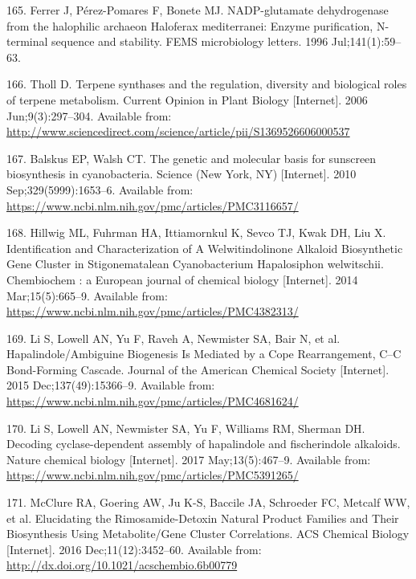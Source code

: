 \documentclass[12pt,twoside]{reedthesis}
\begin{document}
  \hypertarget{ref-ferrer_nadp-glutamate_1996}{}
  165. Ferrer J, Pérez-Pomares F, Bonete MJ. NADP-glutamate dehydrogenase
  from the halophilic archaeon Haloferax mediterranei: Enzyme
  purification, N-terminal sequence and stability. FEMS microbiology
  letters. 1996 Jul;141(1):59--63.
  
  \hypertarget{ref-tholl_terpene_2006}{}
  166. Tholl D. Terpene synthases and the regulation, diversity and
  biological roles of terpene metabolism. Current Opinion in Plant Biology
  {[}Internet{]}. 2006 Jun;9(3):297--304. Available from:
  \url{http://www.sciencedirect.com/science/article/pii/S1369526606000537}
  
  \hypertarget{ref-balskus_genetic_2010}{}
  167. Balskus EP, Walsh CT. The genetic and molecular basis for sunscreen
  biosynthesis in cyanobacteria. Science (New York, NY) {[}Internet{]}.
  2010 Sep;329(5999):1653--6. Available from:
  \url{https://www.ncbi.nlm.nih.gov/pmc/articles/PMC3116657/}
  
  \hypertarget{ref-hillwig_identification_2014}{}
  168. Hillwig ML, Fuhrman HA, Ittiamornkul K, Sevco TJ, Kwak DH, Liu X.
  Identification and Characterization of A Welwitindolinone Alkaloid
  Biosynthetic Gene Cluster in Stigonematalean Cyanobacterium Hapalosiphon
  welwitschii. Chembiochem : a European journal of chemical biology
  {[}Internet{]}. 2014 Mar;15(5):665--9. Available from:
  \url{https://www.ncbi.nlm.nih.gov/pmc/articles/PMC4382313/}
  
  \hypertarget{ref-li_hapalindole_ambiguine_2015}{}
  169. Li S, Lowell AN, Yu F, Raveh A, Newmister SA, Bair N, et al.
  Hapalindole/Ambiguine Biogenesis Is Mediated by a Cope Rearrangement,
  C--C Bond-Forming Cascade. Journal of the American Chemical Society
  {[}Internet{]}. 2015 Dec;137(49):15366--9. Available from:
  \url{https://www.ncbi.nlm.nih.gov/pmc/articles/PMC4681624/}
  
  \hypertarget{ref-li_decoding_2017}{}
  170. Li S, Lowell AN, Newmister SA, Yu F, Williams RM, Sherman DH.
  Decoding cyclase-dependent assembly of hapalindole and fischerindole
  alkaloids. Nature chemical biology {[}Internet{]}. 2017
  May;13(5):467--9. Available from:
  \url{https://www.ncbi.nlm.nih.gov/pmc/articles/PMC5391265/}
  
  \hypertarget{ref-mcclure_elucidating_2016}{}
  171. McClure RA, Goering AW, Ju K-S, Baccile JA, Schroeder FC, Metcalf
  WW, et al. Elucidating the Rimosamide-Detoxin Natural Product Families
  and Their Biosynthesis Using Metabolite/Gene Cluster Correlations. ACS
  Chemical Biology {[}Internet{]}. 2016 Dec;11(12):3452--60. Available
  from: \url{http://dx.doi.org/10.1021/acschembio.6b00779}
  
\end{document}

